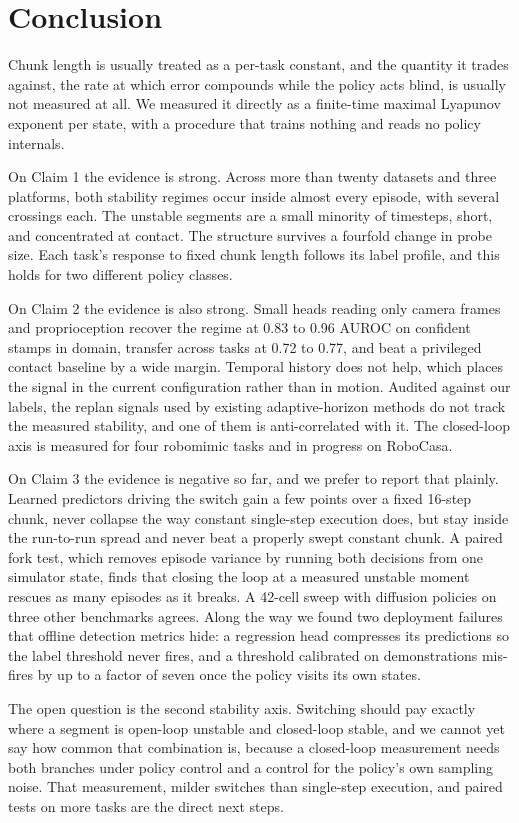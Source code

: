 \section{Conclusion}

Chunk length is usually treated as a per-task constant, and the quantity it
trades against, the rate at which error compounds while the policy acts blind,
is usually not measured at all. We measured it directly as a finite-time
maximal Lyapunov exponent per state, with a procedure that trains nothing and
reads no policy internals.

On Claim 1 the evidence is strong. Across more than twenty datasets and three
platforms, both stability regimes occur inside almost every episode, with
several crossings each. The unstable segments are a small minority of
timesteps, short, and concentrated at contact. The structure survives a
fourfold change in probe size. Each task's response to fixed chunk length
follows its label profile, and this holds for two different policy classes.

On Claim 2 the evidence is also strong. Small heads reading only camera frames
and proprioception recover the regime at 0.83 to 0.96 AUROC on confident stamps
in domain, transfer across tasks at 0.72 to 0.77, and beat a privileged contact
baseline by a wide margin. Temporal history does not help, which places the
signal in the current configuration rather than in motion. Audited against our
labels, the replan signals used by existing adaptive-horizon methods do not
track the measured stability, and one of them is anti-correlated with it. The
closed-loop axis is measured for four robomimic tasks and in progress on
RoboCasa.

On Claim 3 the evidence is negative so far, and we prefer to report that
plainly. Learned predictors driving the switch gain a few points over a fixed
16-step chunk, never collapse the way constant single-step execution does, but
stay inside the run-to-run spread and never beat a properly swept constant
chunk. A paired fork test, which removes episode variance by running both
decisions from one simulator state, finds that closing the loop at a measured
unstable moment rescues as many episodes as it breaks. A 42-cell sweep with
diffusion policies on three other benchmarks agrees. Along the way we found two
deployment failures that offline detection metrics hide: a regression head
compresses its predictions so the label threshold never fires, and a threshold
calibrated on demonstrations mis-fires by up to a factor of seven once the
policy visits its own states.

The open question is the second stability axis. Switching should pay exactly
where a segment is open-loop unstable and closed-loop stable, and we cannot yet
say how common that combination is, because a closed-loop measurement needs
both branches under policy control and a control for the policy's own sampling
noise. That measurement, milder switches than single-step execution, and paired
tests on more tasks are the direct next steps.
